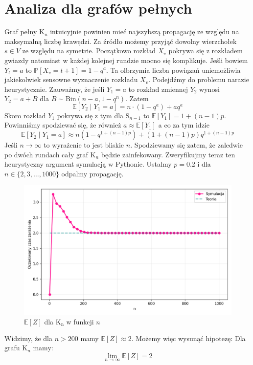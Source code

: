 \section{Analiza dla grafów pełnych}

Graf pełny $\mathrm{K}_n$ intuicyjnie powinien mieć najszybszą propagację ze względu na maksymalną liczbę krawędzi. Za źródło możemy przyjąć dowolny wierzchołek $s\in V$ ze względu na symetrie. Początkowo rozkład $X_v$ pokrywa się z rozkładem gwiazdy natomiast w każdej kolejnej rundzie mocno się komplikuje. Jeśli bowiem $Y_t=a$ to $\mathbb{P}[X_v = t+1] = 1 - q^a$. Ta olbrzymia liczba powiązań uniemożliwia jakiekolwiek sensowne wyznaczenie rozkładu $X_v$. Podejdźmy do problemu narazie heurystycznie. Zauważmy, że jeśli $Y_1=a$ to rozkład zmiennej $Y_2$ wynosi $Y_2 = a + B$ dla $B \sim \mathrm{Bin}(n-a, 1-q^n)$. Zatem 
\[
    \mathbb{E}[Y_2\mid Y_1 = a] = n\cdot (1-q^a) + aq^a
\]
Skoro rozkład $Y_1$ pokrywa się z tym dla $\mathrm{S}_{n-1}$ to $\mathbb{E}[Y_1]=1+(n-1)p$. Powinniśmy spodziewać się, że również $a \approx \mathbb{E}[Y_1]$ a co za tym idzie 
\[
    \mathbb{E}[Y_2\mid Y_1 = a] \approx n(1-q^{1+(n-1)p})+(1+(n-1)p)q^{1+(n-1)p} 
\]
Jeśli $n\to\infty$ to wyrażenie to jest bliskie $n$. Spodziewamy się zatem, że zaledwie po dwóch rundach cały graf $\mathrm{K}_n$ będzie zainfekowany. Zweryfikujmy teraz ten heurystyczny argument symulacją w Pythonie. Ustalmy $p=0.2$ i dla $n\in\{2,3,\dots,1000\}$ odpalmy propagację. 
\begin{figure}[h!]
    \centering
    \includegraphics[width=1\textwidth]{../img/complete/full_infection_expectation.png}
    \caption{$\mathbb{E}[Z]$ dla $\mathrm{K_n}$ w funkcji $n$}
\end{figure}
Widzimy, że dla $n>200$ mamy $\mathbb{E}[Z] \approx 2$. Możemy więc wysunąć hipotezę: Dla grafu $\mathrm{K}_n$ mamy:
\[
    \lim_{n\to\infty} \mathbb{E}[Z] = 2
\]



